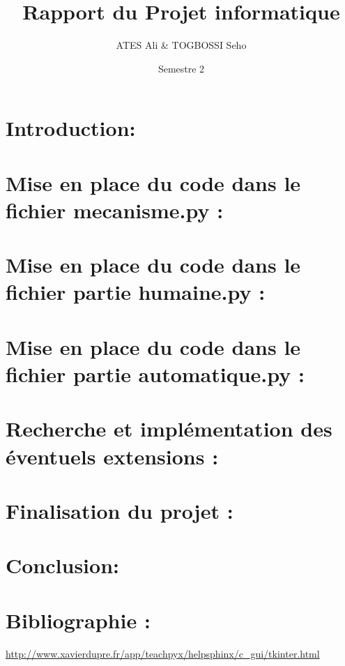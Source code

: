 \documentclass{article}
\author{ATES Ali \& TOGBOSSI Seho}
\date{Semestre 2}
\title{Rapport du Projet informatique}
\begin{document}
\maketitle
\tableofcontents
	\section*{Introduction:}
	\section{Mise en place du code dans le fichier mecanisme.py :}
	\section{Mise en place du code dans le fichier partie humaine.py :}
	\section{Mise en place du code dans le fichier partie automatique.py :}
	\section{Recherche et implémentation des éventuels extensions :}
	\section{Finalisation du projet :}
	\section*{Conclusion:}

	\section*{Bibliographie :}
		\url{http://www.xavierdupre.fr/app/teachpyx/helpsphinx/c_gui/tkinter.html}
\end{document}
